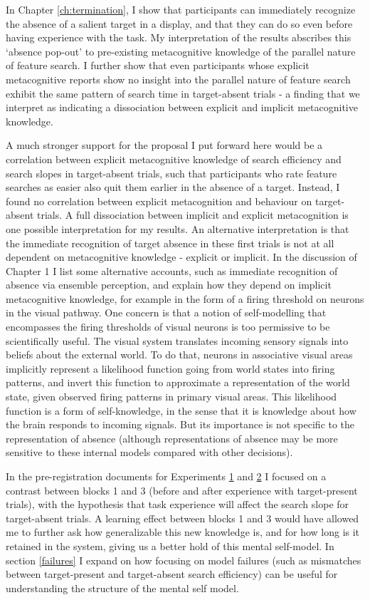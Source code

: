 \documentclass[12pt,twoside]{reedthesis}
\begin{document}
In Chapter \ref{ch:termination}, I show that participants can immediately recognize the absence of a salient target in a display, and that they can do so even before having experience with the task. My interpretation of the results abscribes this `absence pop-out' to pre-existing metacognitive knowledge of the parallel nature of feature search. I further show that even participants whose explicit metacognitive reports show no insight into the parallel nature of feature search exhibit the same pattern of search time in target-absent trials - a finding that we interpret as indicating a dissociation between explicit and implicit metacognitive knowledge.

A much stronger support for the proposal I put forward here would be a correlation between explicit metacognitive knowledge of search efficiency and search slopes in target-absent trials, such that participants who rate feature searches as easier also quit them earlier in the absence of a target. Instead, I found no correlation between explicit metacognition and behaviour on target-absent trials. A full dissociation between implicit and explicit metacognition is one possible interpretation for my results. An alternative interpretation is that the immediate recognition of target absence in these first trials is not at all dependent on metacognitive knowledge - explicit or implicit.
In the discussion of Chapter 1 I list some alternative accounts, such as immediate recognition of absence via ensemble perception, and explain how they depend on implicit metacognitive knowledge, for example in the form of a firing threshold on neurons in the visual pathway. One concern is that a notion of self-modelling that encompasses the firing thresholds of visual neurons is too permissive to be scientifically useful. The visual system translates incoming sensory signals into beliefs about the external world. To do that, neurons in associative visual areas implicitly represent a likelihood function going from world states into firing patterns, and invert this function to approximate a representation of the world state, given observed firing patterns in primary visual areas. This likelihood function is a form of self-knowledge, in the sense that it is knowledge about how the brain responds to incoming signals. But its importance is not specific to the representation of absence (although representations of absence may be more sensitive to these internal models compared with other decisions).

In the pre-registration documents for Experiments \href{https://osf.io/ea385}{1} and \href{https://osf.io/v6mnb}{2} I focused on a contrast between blocks 1 and 3 (before and after experience with target-present trials), with the hypothesis that task experience will affect the search slope for target-absent trials. A learning effect between blocks 1 and 3 would have allowed me to further ask how generalizable this new knowledge is, and for how long is it retained in the system, giving us a better hold of this mental self-model. In section \ref{failures} I expand on how focusing on model failures (such as mismatches between target-present and target-absent search efficiency) can be useful for understanding the structure of the mental self model.
\end{document}

